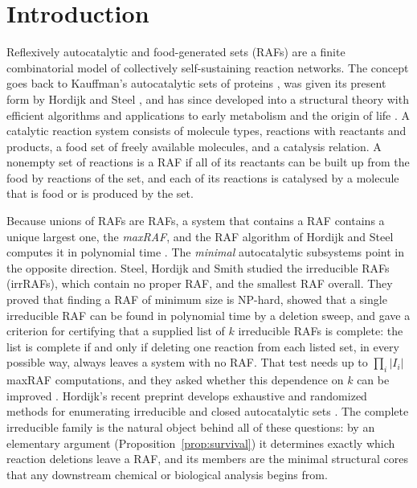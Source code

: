 \documentclass[11pt,a4paper]{article}
\theoremstyle{plain}
\theoremstyle{definition}
\theoremstyle{remark}
\begin{document}
\section{Introduction}\label{sec:intro}

Reflexively autocatalytic and food-generated sets (RAFs) are a finite combinatorial model of collectively self-sustaining reaction networks. The concept goes back to Kauffman's autocatalytic sets of proteins \cite{kauffman1986autocatalytic,kauffman1993origins}, was given its present form by Hordijk and Steel \cite{hordijk2004detecting}, and has since developed into a structural theory with efficient algorithms \cite{hordijk2012structure,hordijk2015algorithms,steel2019autocatalytic,steel2020structure,steel2023interior} and applications to early metabolism and the origin of life \cite{hordijk2017chasing,hordijk2018life,xavier2020autocatalytic,sousa2015ecoli}. A catalytic reaction system consists of molecule types, reactions with reactants and products, a food set of freely available molecules, and a catalysis relation. A nonempty set of reactions is a RAF if all of its reactants can be built up from the food by reactions of the set, and each of its reactions is catalysed by a molecule that is food or is produced by the set.

Because unions of RAFs are RAFs, a system that contains a RAF contains a unique largest one, the \emph{maxRAF}, and the RAF algorithm of Hordijk and Steel computes it in polynomial time \cite{hordijk2004detecting}. The \emph{minimal} autocatalytic subsystems point in the opposite direction. Steel, Hordijk and Smith \cite{steel2013minimal} studied the irreducible RAFs (irrRAFs), which contain no proper RAF, and the smallest RAF overall. They proved that finding a RAF of minimum size is NP-hard, showed that a single irreducible RAF can be found in polynomial time by a deletion sweep, and gave a criterion for certifying that a supplied list of $k$ irreducible RAFs is complete: the list is complete if and only if deleting one reaction from each listed set, in every possible way, always leaves a system with no RAF. That test needs up to $\prod_i|I_i|$ maxRAF computations, and they asked whether this dependence on $k$ can be improved \cite[Section~6.1]{steel2013minimal}. Hordijk's recent preprint develops exhaustive and randomized methods for enumerating irreducible and closed autocatalytic sets \cite{hordijk2026enumerating}. The complete irreducible family is the natural object behind all of these questions: by an elementary argument (Proposition~\ref{prop:survival}) it determines exactly which reaction deletions leave a RAF, and its members are the minimal structural cores that any downstream chemical or biological analysis begins from.
\end{document}
